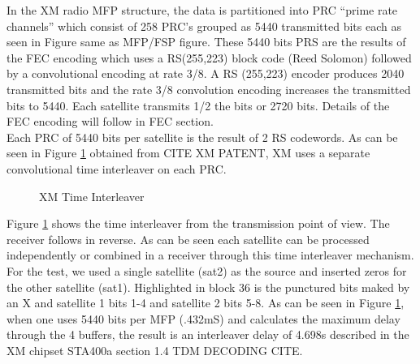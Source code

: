 \documentclass[conference,onecolumn]{IEEEtran}
\begin{document}
In the XM radio MFP structure, the data is partitioned into PRC ``prime rate channels'' which consist of 258 PRC's grouped as 5440 transmitted bits each as seen in Figure {same as MFP/FSP figure}.  These 5440 bits PRS are the results of the FEC encoding which uses a RS(255,223) block code (Reed Solomon) followed by a convolutional encoding at rate 3/8.  A RS (255,223) encoder produces 2040 transmitted bits and the rate 3/8 convolution encoding increases the transmitted bits to 5440.  Each satellite transmits 1/2 the bits or 2720 bits.  Details of the FEC encoding will follow in FEC section.\\
Each PRC of 5440 bits per satellite is the result of 2 RS codewords.  As can be seen in Figure \ref{fig::time_interleaver} obtained from {CITE XM PATENT}, XM uses a separate convolutional time interleaver on each PRC.

\begin{figure}[H]
	\centerline{}
	\caption{XM Time Interleaver}
	\label{fig::time_interleaver}
\end{figure}

Figure \ref{fig::time_interleaver} shows the time interleaver from the transmission point of view.  The receiver follows in reverse. As can be seen each satellite can be processed independently or combined in a receiver through this time interleaver mechanism.  For the test, we used a single satellite (sat2) as the source and inserted zeros for the other satellite (sat1). Highlighted in block 36 is the punctured bits maked by an X and satellite 1 bits 1-4 and satellite 2 bits 5-8.  As can be seen in Figure \ref{fig::time_interleaver}, when one uses 5440 bits per MFP (.432mS) and calculates the maximum delay through the 4 buffers, the result is an interleaver delay of 4.698s described in the XM chipset STA400a section 1.4 TDM DECODING {CITE}.
\end{document}
